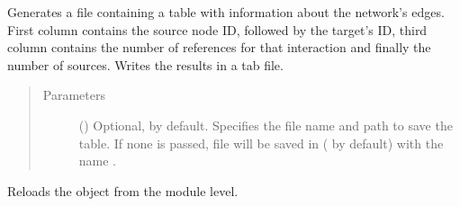 \documentclass[letterpaper,10pt,english]{sphinxmanual}
\begin{document}
\begin{fulllineitems}
\begin{fulllineitems}
\begin{quote}
\begin{description}
\end{description}\end{quote}

\end{fulllineitems}


\begin{fulllineitems}
\label{\detokenize{reference:pypath.main.PyPath.reference_hist}}
Generates a file containing a table with information about the
network’s edges. First column contains the source node ID,
followed by the target’s ID, third column contains the number of
references for that interaction and finally the number of
sources. Writes the results in a tab file.
\begin{quote}\begin{description}
\item[{Parameters}] \leavevmode
{} () \textendash{} Optional,  by default. Specifies the file name and
path to save the table. If none is passed, file will be
saved in  (
by default) with the name .

\end{description}\end{quote}

\end{fulllineitems}


\begin{fulllineitems}
\label{\detokenize{reference:pypath.main.PyPath.reload}}
Reloads the object from the module level.

\end{fulllineitems}


\begin{fulllineitems}
\label{\detokenize{reference:pypath.main.PyPath.remove_htp}}
\end{fulllineitems}


\end{fulllineitems}
\end{document}
